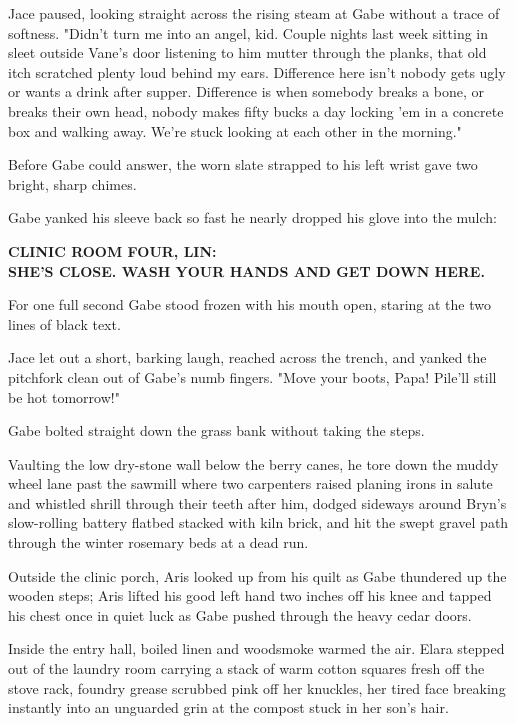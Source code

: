 Jace paused, looking straight across the rising steam at Gabe without a trace of softness. "Didn't turn me into an angel, kid. Couple nights last week sitting in sleet outside Vane's door listening to him mutter through the planks, that old itch scratched plenty loud behind my ears. Difference here isn't nobody gets ugly or wants a drink after supper. Difference is when somebody breaks a bone, or breaks their own head, nobody makes fifty bucks a day locking 'em in a concrete box and walking away. We're stuck looking at each other in the morning."

Before Gabe could answer, the worn slate strapped to his left wrist gave two bright, sharp chimes.

Gabe yanked his sleeve back so fast he nearly dropped his glove into the mulch:

\begin{center}
\textbf{CLINIC ROOM FOUR, LIN:}\\
\textbf{SHE'S CLOSE. WASH YOUR HANDS AND GET DOWN HERE.}
\end{center}

For one full second Gabe stood frozen with his mouth open, staring at the two lines of black text.

Jace let out a short, barking laugh, reached across the trench, and yanked the pitchfork clean out of Gabe's numb fingers. "Move your boots, Papa! Pile'll still be hot tomorrow!"

Gabe bolted straight down the grass bank without taking the steps.

Vaulting the low dry-stone wall below the berry canes, he tore down the muddy wheel lane past the sawmill where two carpenters raised planing irons in salute and whistled shrill through their teeth after him, dodged sideways around Bryn's slow-rolling battery flatbed stacked with kiln brick, and hit the swept gravel path through the winter rosemary beds at a dead run.

Outside the clinic porch, Aris looked up from his quilt as Gabe thundered up the wooden steps; Aris lifted his good left hand two inches off his knee and tapped his chest once in quiet luck as Gabe pushed through the heavy cedar doors.

Inside the entry hall, boiled linen and woodsmoke warmed the air. Elara stepped out of the laundry room carrying a stack of warm cotton squares fresh off the stove rack, foundry grease scrubbed pink off her knuckles, her tired face breaking instantly into an unguarded grin at the compost stuck in her son's hair.

